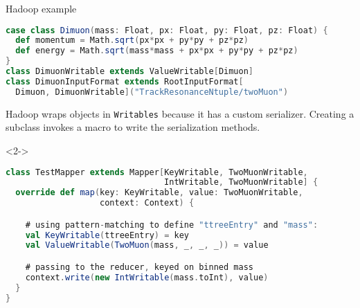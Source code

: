\documentclass{beamer}
\begin{document}
\begin{frame}[fragile]{Hadoop example}
\begin{minipage}{1.1\linewidth}
\begin{lstlisting}[language=scala]
case class Dimuon(mass: Float, px: Float, py: Float, pz: Float) {
  def momentum = Math.sqrt(px*px + py*py + pz*pz)
  def energy = Math.sqrt(mass*mass + px*px + py*py + pz*pz)
}
class DimuonWritable extends ValueWritable[Dimuon]
class DimuonInputFormat extends RootInputFormat[
  Dimuon, DimuonWritable]("TrackResonanceNtuple/twoMuon")
\end{lstlisting}
\end{minipage}

Hadoop wraps objects in {\tt Writables} because it has a custom serializer. Creating a subclass invokes a macro to write the serialization methods.

\begin{uncoverenv}<2->
\begin{lstlisting}[language=scala]
class TestMapper extends Mapper[KeyWritable, TwoMuonWritable,
                                IntWritable, TwoMuonWritable] {
  override def map(key: KeyWritable, value: TwoMuonWritable,
                   context: Context) {

    # using pattern-matching to define "ttreeEntry" and "mass":
    val KeyWritable(ttreeEntry) = key
    val ValueWritable(TwoMuon(mass, _, _, _)) = value

    # passing to the reducer, keyed on binned mass
    context.write(new IntWritable(mass.toInt), value)
  }
}
\end{lstlisting}
\end{uncoverenv}
\end{frame}
\end{document}
